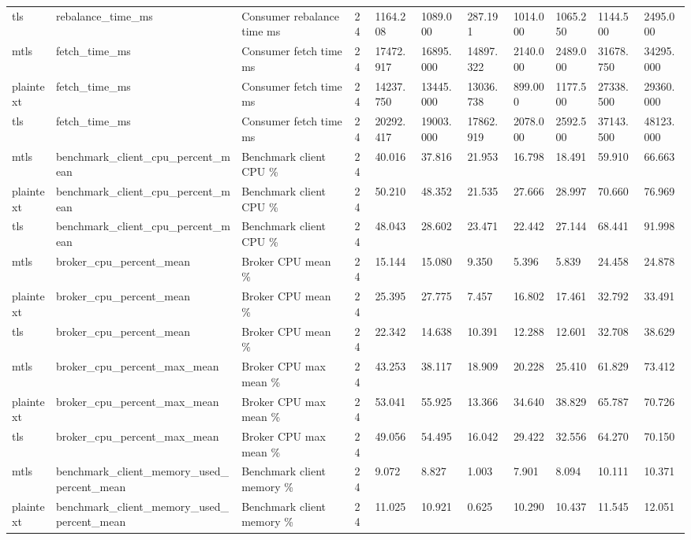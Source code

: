 \begin{longtable}{lllllllllll}
tls & rebalance\_time\_ms & Consumer rebalance time ms & 24 & 1164.208 & 1089.000 & 287.191 & 1014.000 & 1065.250 & 1144.500 & 2495.000 \\
mtls & fetch\_time\_ms & Consumer fetch time ms & 24 & 17472.917 & 16895.000 & 14897.322 & 2140.000 & 2489.000 & 31678.750 & 34295.000 \\
plaintext & fetch\_time\_ms & Consumer fetch time ms & 24 & 14237.750 & 13445.000 & 13036.738 & 899.000 & 1177.500 & 27338.500 & 29360.000 \\
tls & fetch\_time\_ms & Consumer fetch time ms & 24 & 20292.417 & 19003.000 & 17862.919 & 2078.000 & 2592.500 & 37143.500 & 48123.000 \\
mtls & benchmark\_client\_cpu\_percent\_mean & Benchmark client CPU \% & 24 & 40.016 & 37.816 & 21.953 & 16.798 & 18.491 & 59.910 & 66.663 \\
plaintext & benchmark\_client\_cpu\_percent\_mean & Benchmark client CPU \% & 24 & 50.210 & 48.352 & 21.535 & 27.666 & 28.997 & 70.660 & 76.969 \\
tls & benchmark\_client\_cpu\_percent\_mean & Benchmark client CPU \% & 24 & 48.043 & 28.602 & 23.471 & 22.442 & 27.144 & 68.441 & 91.998 \\
mtls & broker\_cpu\_percent\_mean & Broker CPU mean \% & 24 & 15.144 & 15.080 & 9.350 & 5.396 & 5.839 & 24.458 & 24.878 \\
plaintext & broker\_cpu\_percent\_mean & Broker CPU mean \% & 24 & 25.395 & 27.775 & 7.457 & 16.802 & 17.461 & 32.792 & 33.491 \\
tls & broker\_cpu\_percent\_mean & Broker CPU mean \% & 24 & 22.342 & 14.638 & 10.391 & 12.288 & 12.601 & 32.708 & 38.629 \\
mtls & broker\_cpu\_percent\_max\_mean & Broker CPU max mean \% & 24 & 43.253 & 38.117 & 18.909 & 20.228 & 25.410 & 61.829 & 73.412 \\
plaintext & broker\_cpu\_percent\_max\_mean & Broker CPU max mean \% & 24 & 53.041 & 55.925 & 13.366 & 34.640 & 38.829 & 65.787 & 70.726 \\
tls & broker\_cpu\_percent\_max\_mean & Broker CPU max mean \% & 24 & 49.056 & 54.495 & 16.042 & 29.422 & 32.556 & 64.270 & 70.150 \\
mtls & benchmark\_client\_memory\_used\_percent\_mean & Benchmark client memory \% & 24 & 9.072 & 8.827 & 1.003 & 7.901 & 8.094 & 10.111 & 10.371 \\
plaintext & benchmark\_client\_memory\_used\_percent\_mean & Benchmark client memory \% & 24 & 11.025 & 10.921 & 0.625 & 10.290 & 10.437 & 11.545 & 12.051 \\

\end{longtable}
